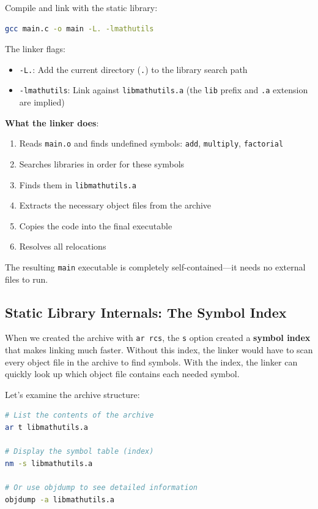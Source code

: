 Compile and link with the static library:

\begin{lstlisting}[language=bash]
gcc main.c -o main -L. -lmathutils
\end{lstlisting}

The linker flags:
\begin{itemize}
    \item \texttt{-L.}: Add the current directory (\texttt{.}) to the library search path
    \item \texttt{-lmathutils}: Link against \texttt{libmathutils.a} (the \texttt{lib} prefix and \texttt{.a} extension are implied)
\end{itemize}

\textbf{What the linker does}:
\begin{enumerate}
    \item Reads \texttt{main.o} and finds undefined symbols: \texttt{add}, \texttt{multiply}, \texttt{factorial}
    \item Searches libraries in order for these symbols
    \item Finds them in \texttt{libmathutils.a}
    \item Extracts the necessary object files from the archive
    \item Copies the code into the final executable
    \item Resolves all relocations
\end{enumerate}

The resulting \texttt{main} executable is completely self-contained—it needs no external files to run.

\subsection{Static Library Internals: The Symbol Index}

When we created the archive with \texttt{ar rcs}, the \texttt{s} option created a \textbf{symbol index} that makes linking much faster. Without this index, the linker would have to scan every object file in the archive to find symbols. With the index, the linker can quickly look up which object file contains each needed symbol.

Let's examine the archive structure:

\begin{lstlisting}[language=bash]
# List the contents of the archive
ar t libmathutils.a

# Display the symbol table (index)
nm -s libmathutils.a

# Or use objdump to see detailed information
objdump -a libmathutils.a
\end{lstlisting}


